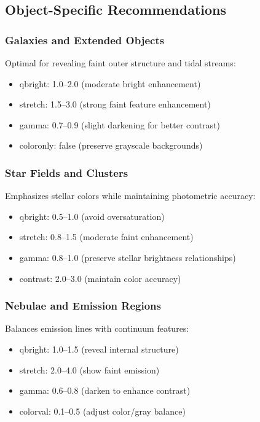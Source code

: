 \documentclass[11pt,a4paper]{article}
\begin{document}
\subsection{Object-Specific Recommendations}

\subsubsection{Galaxies and Extended Objects}

Optimal for revealing faint outer structure and tidal streams:

\begin{itemize}[leftmargin=*]
\item qbright: 1.0--2.0 (moderate bright enhancement)
\item stretch: 1.5--3.0 (strong faint feature enhancement)
\item gamma: 0.7--0.9 (slight darkening for better contrast)
\item coloronly: false (preserve grayscale backgrounds)
\end{itemize}

\subsubsection{Star Fields and Clusters}

Emphasizes stellar colors while maintaining photometric accuracy:

\begin{itemize}[leftmargin=*]
\item qbright: 0.5--1.0 (avoid oversaturation)
\item stretch: 0.8--1.5 (moderate faint enhancement)
\item gamma: 0.8--1.0 (preserve stellar brightness relationships)
\item contrast: 2.0--3.0 (maintain color accuracy)
\end{itemize}

\subsubsection{Nebulae and Emission Regions}

Balances emission lines with continuum features:

\begin{itemize}[leftmargin=*]
\item qbright: 1.0--1.5 (reveal internal structure)
\item stretch: 2.0--4.0 (show faint emission)
\item gamma: 0.6--0.8 (darken to enhance contrast)
\item colorval: 0.1--0.5 (adjust color/gray balance)
\end{itemize}
\end{document}

